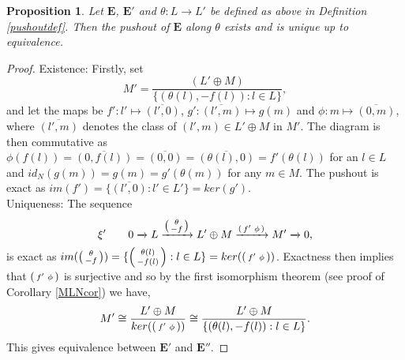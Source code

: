 \documentclass[11.5pt, twoside, a4paper, titlepage]{report}
\theoremstyle{definition}
\theoremstyle{plain}
\newtheorem{prop}[mydef]{Proposition}
\begin{document}
\begin{prop} \label{pushoutprop}
Let $\mathbf{E}$, $\mathbf{E'}$ and $\theta: L \to L'$ be defined as above in Definition \ref{pushoutdef}. Then the pushout of $\mathbf{E}$ along $\theta$ exists and is unique up to equivalence.
\end{prop}
\begin{proof}
Existence: Firstly, set
\begin{equation*}
M'=\frac{(L'\oplus M)}{\{(\theta(l), -f(l)): l\in L\}},
\end{equation*}
and let the maps be $f': l'\mapsto \overline{(l',0)}$, $g': \overline{(l',m)}\mapsto g(m)$ and $\phi: m \mapsto \overline{(0,m)}$, where $\overline{(l',m)}$ denotes the class of $(l', m) \in L'\oplus M$ in $M'$. The diagram is then commutative as $\phi(f(l))=\overline{(0,f(l))}=\overline{(0,0)}=\overline{(\theta(l),0)}=f'(\theta(l))$ for an $l\in L$ and $id_N(g(m))=g(m)=g'(\theta(m))$ for any $m\in M$. The pushout is exact as $im(f')=\{\overline{(l',0)}:l'\in L'\}=ker(g')$.\\
Uniqueness: The sequence
\begin{equation*}
\mathbf{\xi'} \qquad 0\xrightarrow{}L \xrightarrow{\begin{psmallmatrix}\theta \\ -f \end{psmallmatrix}} L'\oplus M \xrightarrow{\begin{psmallmatrix} f' & \phi \end{psmallmatrix}} M' \xrightarrow{} 0,
\end{equation*}
is exact as $im(\begin{psmallmatrix}\theta \\ -f \end{psmallmatrix})=\{\begin{psmallmatrix}\theta(l) \\ -f(l) \end{psmallmatrix}: l \in L\}=ker(\begin{psmallmatrix} f' & \phi \end{psmallmatrix})$. Exactness then implies that $\begin{psmallmatrix} f' & \phi \end{psmallmatrix}$ is surjective and so by the first isomorphism theorem (see proof of Corollary \ref{MLNcor}) we have,
\begin{equation*}
M' \cong \frac{L'\oplus M}{ker(\begin{psmallmatrix} f' & \phi \end{psmallmatrix})} \cong \frac{L'\oplus M}{\{(\theta(l), -f(l)): l\in L\}}.
\end{equation*}
This gives equivalence between $\mathbf{E'}$ and $\mathbf{E''}$.
\end{proof}
\end{document}
